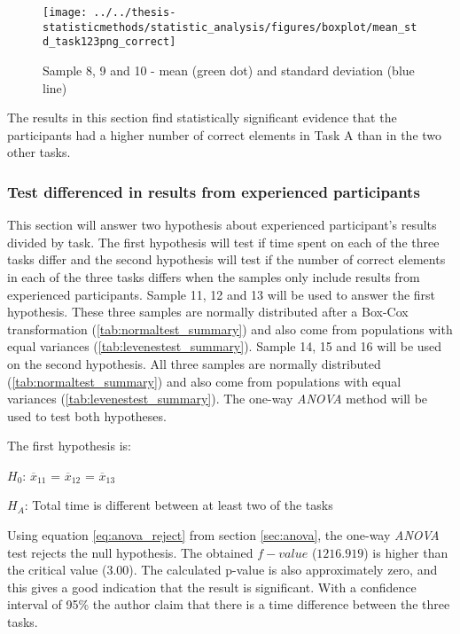 \begin{figure}[H]
	\centering
	\texttt{[image: ../../thesis-statisticmethods/statistic\_analysis/figures/boxplot/mean\_std\_task123png\_correct]}
	\caption{Sample 8, 9 and 10 - mean (green dot) and standard deviation (blue line)}
	\label{fig:meanstdtask123pngcorrect}
\end{figure}

\vspace{0.3cm}

The results in this section find statistically significant evidence that the participants had a higher number of correct elements in Task A than in the two other tasks. 

\subsubsection[Sample 11 - 16]{Test differenced in results from experienced participants}\label{sec:sample_11_12_13_anova}
This section will answer two hypothesis about experienced participant's results divided by task. The first hypothesis will test if time spent on each of the three tasks differ and the second hypothesis will test if the number of correct elements in each of the three tasks differs when the samples only include results from experienced participants. Sample 11, 12 and 13 will be used to answer the first hypothesis. These three samples are normally distributed after a Box-Cox transformation (\ref{tab:normaltest_summary}) and also come from populations with equal variances (\ref{tab:levenestest_summary}). Sample 14, 15 and 16 will be used on the second hypothesis. All three samples are normally distributed (\ref{tab:normaltest_summary}) and also come from populations with equal variances (\ref{tab:levenestest_summary}). The one-way \textit{ANOVA} method will be used to test both hypotheses. 

The first hypothesis is:\\
\centerline{$H_{0}$: $\overline{x}_{11}$ = $\overline{x}_{12}$ = $\overline{x}_{13}$}
\centerline{$H_{A}$: Total time is different between at least two of the tasks}
\vspace{0.2cm}

Using equation \ref{eq:anova_reject}  from section \ref{sec:anova}, the one-way \textit{ANOVA} test rejects the null hypothesis. The obtained $f-value$ ($1216.919$) is higher than the critical value ($3.00$). The calculated p-value is also approximately zero, and this gives a good indication that the result is significant. With a confidence interval of 95\% the author claim that there is a time difference between the three tasks. 

